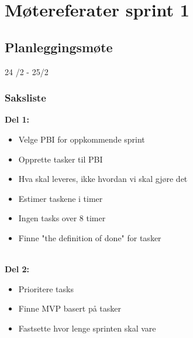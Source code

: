 \chapter{Møtereferater sprint 1}

\section{Planleggingsmøte}
\label{app:MotereferaterSprint1_planleggingsmote}
24 /2 - 25/2 
 
\subsection{Saksliste}

\textbf{Del 1:}
\begin{itemize}
\item Velge PBI for oppkommende sprint 
\item Opprette tasker til PBI  
\item Hva skal leveres, ikke hvordan vi skal gjøre det 
\item Estimer taskene i timer 
\item Ingen tasks over 8 timer 
\item Finne "the definition of done" for tasker 
\end{itemize}
\\ 
\textbf{Del 2:}
\begin{itemize}
\item Prioritere tasks
\item Finne MVP basert på tasker 
\item Fastsette hvor lenge sprinten skal vare 
\end{itemize}


